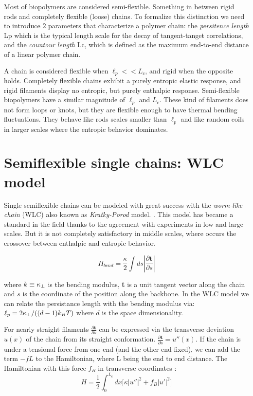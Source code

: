 Most of biopolymers are considered semi-flexible. Something in between
rigid rods and completely flexible (loose) chains.  To formalize this
distinction we need to introduce $2$ parameters that characterize a polymer
chain: the \emph{persitence length} \gls{Lp} which is the typical length scale
for the decay of tangent-tanget correlations, and the \emph{countour length}
\gls{Lc}, which is defined as the maximum end-to-end distance of a linear
polymer chain.

A chain is considered flexible when $\ell_p<<L_c$, and rigid when the opposite
holds. Completely flexible chains exhibit a purely entropic elastic
response, and rigid filaments display no entropic, but purely enthalpic
response. Semi-flexible biopolymers have a similar magnitude of $\ell_p$ and
$L_c$. These kind of filaments does not form loops or knots, but they are
flexible enough to have thermal bending
fluctuations\citep{storm_nonlinear_2005}. They behave like rods scales smaller
than $\ell_p$ and like random coils in larger scales where the entropic behavior
dominates.

\section{Semiflexible single chains: WLC model}
Single semiflexible chains can be modeled with great success with the
\emph{worm-like chain} (WLC) also known as \emph{Kratky-Porod} model.
\citep{rubinstein_polymer_2003, schuster_hierarchical_2011}. This model has
became a standard in the field thanks to the agreement with experiments in low
and large scales.
But it is not completely satisfactory in middle scales, where occurs the
crossover between enthalpic and entropic behavior.\citet{hsu_breakdown_2011}

$$H_{bend}=\frac{\kappa}{2} \int ds|\frac{\partial \textbf{t}}{\partial s}|$$

where $k\equiv\kappa_\perp{}$ is the bending modulus, \textbf{t} is a unit tangent
vector along the chain and $s$ is the coordinate of the position along the
backbone. In the WLC model we can relate the persistance length with the bending
modulus via: $\ell_p{}=2\kappa_\perp{}/((d-1)k_B{}T)$ where $d$ is the space
dimensionality.

For nearly straight filaments $\frac{\partial \textbf{t}}{\partial s}$ can be
expressed via the transverse deviation $u(x)$ of the chain from its straight
conformation. $\frac{\partial \textbf{t}}{\partial s}=u''(x)$. If the chain is
under a tensional force from one end (and the other end fixed), we can add the
term $-fL$ to the Hamiltonian, where L being the end to end distance. The
Hamiltonian with this force $f_B$ in transverse coordinates :
\begin{equation}\label{WLC_H}
H=\frac{1}{2}\int_0^{L_c} dx\Big[\kappa|u''|^2 + f_B|u'|^2\Big]
\end{equation}

